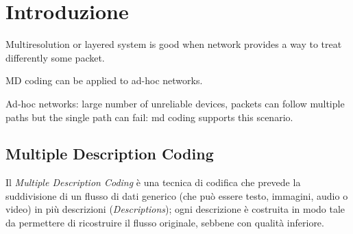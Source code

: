 

\chapter{Introduzione}

Multiresolution or layered system is good when network provides a way to treat
differently some packet.

MD coding can be applied to ad-hoc networks.

Ad-hoc networks: large number of unreliable devices, packets can follow
multiple paths but the single path can fail: md coding supports this scenario.

\section*{Multiple Description Coding}
Il \emph{Multiple Description Coding} è una tecnica di codifica che prevede la
suddivisione di un flusso di dati generico (che può essere testo, immagini,
audio o video) in più descrizioni (\emph{Descriptions}); ogni descrizione
è costruita in modo tale da permettere di ricostruire il flusso originale,
sebbene con qualità inferiore.
